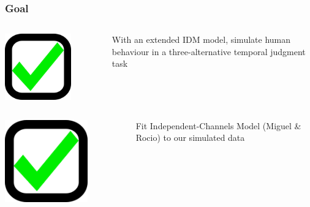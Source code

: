 \documentclass[xcolor={fixpdftex,hyperref,x11names},10pt,pdftex,hyperref={pdftex}]{beamer}
\begin{document}
\begin{frame}
  \frametitle{Goal}
  \begin{columns}
  \begin{column}{0.30\textwidth}
  \includegraphics[width=0.7\textwidth]{figs/checkbox-checked.png}
  \end{column}
  \begin{column}{0.70\textwidth}
  With an extended IDM model, simulate human behaviour in a three-alternative temporal judgment task
  \end{column}
  \end{columns}
  \begin{columns}
  \begin{column}{0.30\textwidth}
  \includegraphics[width=0.7\textwidth]{figs/checkbox-checked.png}
  \end{column}
  \begin{column}{0.70\textwidth}
  Fit Independent-Channels Model (Miguel \& Rocio) to our simulated data 
  \end{column}
  \end{columns}
\end{frame} 
\end{document}
